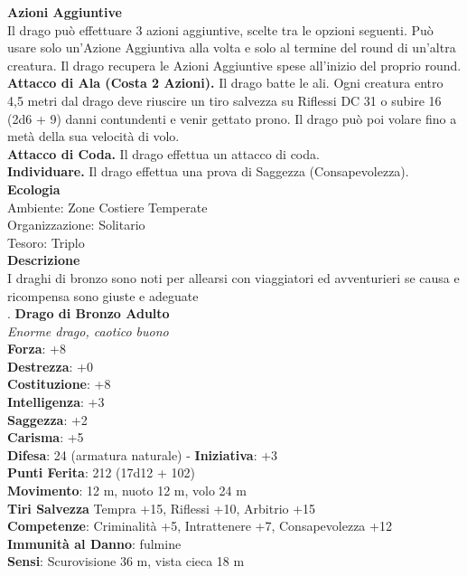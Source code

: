 \begin{multicols}{2}
\textbf{Azioni Aggiuntive}\\
Il drago può effettuare 3 azioni aggiuntive, scelte tra le opzioni seguenti. Può usare solo un'Azione Aggiuntiva alla volta e solo al termine del round di un'altra creatura. Il drago recupera le Azioni Aggiuntive spese all'inizio del proprio round.\\
\textbf{Attacco di Ala (Costa 2 Azioni).} Il drago batte le ali. Ogni creatura entro 4,5 metri dal drago deve riuscire un tiro salvezza su Riflessi DC  31 o subire 16 (2d6 + 9) danni contundenti e venir gettato prono. Il drago può poi volare fino a metà della sua velocità di volo.\\
\textbf{Attacco di Coda.} Il drago effettua un attacco di coda.\\
\textbf{Individuare.} Il drago effettua una prova di Saggezza (Consapevolezza).\\
\textbf{Ecologia}\\
Ambiente: Zone Costiere Temperate\\
Organizzazione: Solitario\\
Tesoro: Triplo\\
\textbf{Descrizione}\\
I draghi di bronzo sono noti per allearsi con viaggiatori ed avventurieri se causa e ricompensa sono giuste e adeguate\\
.
\medskip\textbf{Drago di Bronzo Adulto}\\
\emph{Enorme drago, caotico buono}\\
\textbf{Forza}: +8\\
\textbf{Destrezza}: +0\\
\textbf{Costituzione}: +8\\
\textbf{Intelligenza}: +3\\
\textbf{Saggezza}: +2\\
\textbf{Carisma}: +5\\
\textbf{Difesa}: 24 (armatura naturale) - \textbf{Iniziativa}: +3\\
\textbf{Punti Ferita}: 212 (17d12 + 102)\\
\textbf{Movimento}: 12 m, nuoto 12 m, volo 24 m\\
\textbf{Tiri Salvezza} Tempra +15, Riflessi +10, Arbitrio +15\\
\textbf{Competenze}: Criminalità +5, Intrattenere +7, Consapevolezza +12\\
\textbf{Immunità al Danno}: fulmine\\
\textbf{Sensi}: Scurovisione 36 m, vista cieca 18 m\\

\end{multicols}
